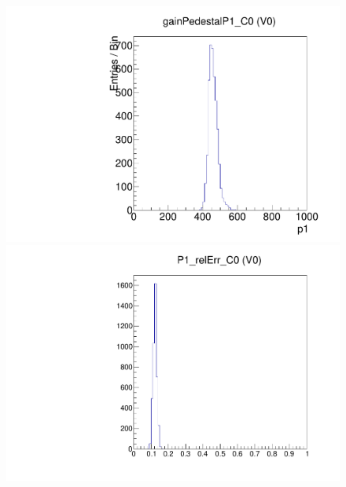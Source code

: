 \begin{figure}[!Hp]
\centering
\begin{minipage}{0.45\textwidth}
  \includegraphics[width=1.0\textwidth]{figures/gainped_gainPedestalP1.pdf}
  \caption{}
  \label{fig:gainped_gainPedestalP1}
\end{minipage}
\hspace{0.3cm}
\begin{minipage}{0.45\textwidth}
  \includegraphics[width=1.0\textwidth]{figures/gainped_P1_relErr.pdf}
  \caption{}
  \label{fig:gainped_P1_relErr}
\end{minipage}
\end{figure}

